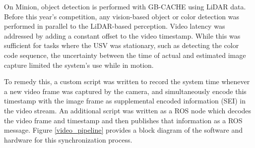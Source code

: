 \documentclass{erauthesis}
\begin{document}
On Minion, object detection is performed with GB-CACHE \cite{coyleE} using LiDAR data.
Before this year's competition, any vision-based object or color detection was performed in parallel to the LiDAR-based perception. 
Video latency was addressed by adding a constant offset to the video timestamp.
While this was sufficient for tasks where the USV was stationary, such as detecting the color code sequence, the uncertainty between the time of actual and estimated image capture limited the system's use while in motion.

To remedy this, a custom script was written to record the system time whenever a new video frame was captured by the camera, and simultaneously encode this timestamp with the image frame as supplemental encoded information (SEI) in the video stream.
An additional script was written as a ROS node which decodes the video frame and timestamp and then publishes that information as a ROS message.
Figure \ref{video_pipeline} provides a block diagram of the software and hardware for this synchronization process.


\end{document}
